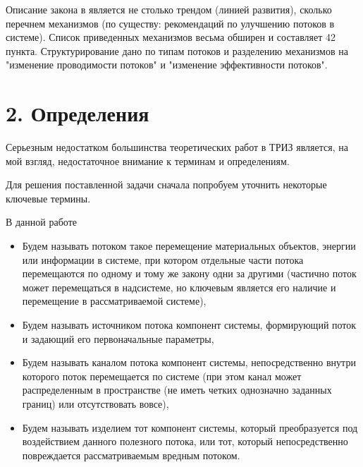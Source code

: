 \documentclass[a4paper,11pt]{article}
\begin{document}
Описание закона в \cite{5} является не столько трендом (линией развития),
сколько перечнем механизмов (по существу: рекомендаций по улучшению потоков в
системе). Список приведенных механизмов весьма обширен и составляет 42 пункта.
Структурирование дано по типам потоков и разделению механизмов на "изменение
проводимости потоков" и "изменение эффективности потоков".

\section{2. Определения} 

Серьезным недостатком большинства теоретических работ в ТРИЗ является, на мой
взгляд, недостаточное внимание к терминам и определениям.

Для решения поставленной задачи сначала попробуем уточнить некоторые ключевые
термины.

В данной работе
\begin{itemize}
\item Будем называть потоком такое перемещение материальных объектов, энергии
  или информации в системе, при котором отдельные части потока перемещаются по
  одному и тому же закону одни за другими (частично поток может перемещаться в
  надсистеме, но ключевым является его наличие и перемещение в рассматриваемой
  системе),
\item Будем называть источником потока компонент системы, формирующий поток и
  задающий его первоначальные параметры,
\item Будем называть каналом потока компонент системы, непосредственно внутри
  которого поток перемещается по системе (при этом канал может распределенным
  в пространстве (не иметь четких однозначно заданных границ) или
  отсутствовать вовсе),
\item Будем называть изделием тот компонент системы, который преобразуется под
  воздействием данного полезного потока, или тот, который непосредственно
  повреждается рассматриваемым вредным потоком.
\end{itemize}
\end{document}
